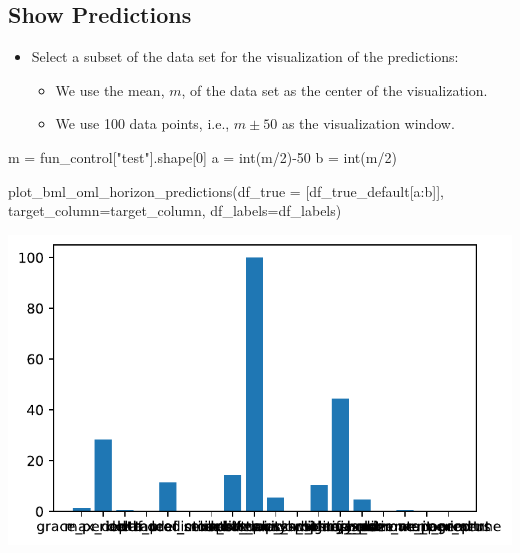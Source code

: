 \documentclass[
  letterpaper,
  DIV=11,
  numbers=noendperiod]{scrreprt}
\newenvironment{Shaded}{\begin{snugshade}}{\end{snugshade}}
\newcommand{\BuiltInTok}[1]{\textcolor[rgb]{0.00,0.23,0.31}{#1}}
\newcommand{\DecValTok}[1]{\textcolor[rgb]{0.68,0.00,0.00}{#1}}
\newcommand{\NormalTok}[1]{\textcolor[rgb]{0.00,0.23,0.31}{#1}}
\newcommand{\OperatorTok}[1]{\textcolor[rgb]{0.37,0.37,0.37}{#1}}
\newcommand{\StringTok}[1]{\textcolor[rgb]{0.13,0.47,0.30}{#1}}
\providecommand{\tightlist}{%
  \setlength{\itemsep}{0pt}\setlength{\parskip}{0pt}}\usepackage{longtable,booktabs,array}
\begin{document}
\subsection{Show Predictions}\label{show-predictions}

\begin{itemize}
\tightlist
\item
  Select a subset of the data set for the visualization of the
  predictions:

  \begin{itemize}
  \tightlist
  \item
    We use the mean, \(m\), of the data set as the center of the
    visualization.
  \item
    We use 100 data points, i.e., \(m \pm 50\) as the visualization
    window.
  \end{itemize}
\end{itemize}

\begin{Shaded}
\begin{Highlighting}[]
\NormalTok{m }\OperatorTok{=}\NormalTok{ fun\_control[}\StringTok{"test"}\NormalTok{].shape[}\DecValTok{0}\NormalTok{]}
\NormalTok{a }\OperatorTok{=} \BuiltInTok{int}\NormalTok{(m}\OperatorTok{/}\DecValTok{2}\NormalTok{)}\OperatorTok{{-}}\DecValTok{50}
\NormalTok{b }\OperatorTok{=} \BuiltInTok{int}\NormalTok{(m}\OperatorTok{/}\DecValTok{2}\NormalTok{)}
\end{Highlighting}
\end{Shaded}

\begin{Shaded}
\begin{Highlighting}[]
\NormalTok{plot\_bml\_oml\_horizon\_predictions(df\_true }\OperatorTok{=}\NormalTok{ [df\_true\_default[a:b]], target\_column}\OperatorTok{=}\NormalTok{target\_column,  df\_labels}\OperatorTok{=}\NormalTok{df\_labels)}
\end{Highlighting}
\end{Shaded}

\includegraphics{024_spot_hpt_river_friedman_hatr_files/figure-pdf/cell-29-output-1.pdf}
\end{document}
